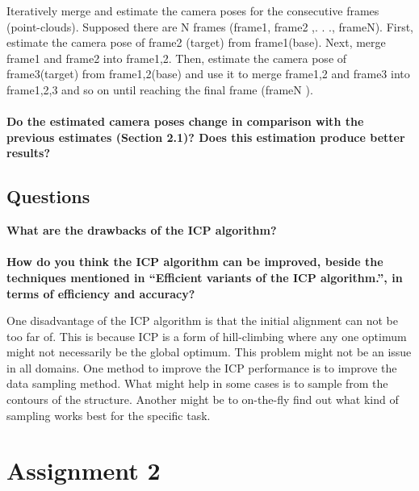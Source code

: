 \documentclass[12pt]{amsart}
\begin{document}
Iteratively merge and estimate the camera poses for the consecutive frames (point-clouds). Supposed there are N frames (frame1, frame2 ,. . ., frameN). First, estimate the camera pose of frame2 (target) from frame1(base). Next, merge frame1 and frame2 into frame1,2. Then, estimate the camera pose of frame3(target) from frame1,2(base) and use it to merge frame1,2 and frame3 into frame1,2,3 and so on until reaching the final frame (frameN ).\\\\ \textbf{Do the estimated camera poses change in comparison with the previous estimates (Section 2.1)? Does this estimation produce better results?}
\subsection{Questions}
\textbf{What are the drawbacks of the ICP algorithm?}\\\\
\textbf{How do you think the ICP algorithm can be improved, beside the techniques mentioned in ``Efficient variants of the ICP algorithm.'', in terms of efficiency and accuracy?}

One disadvantage of the ICP algorithm is that the initial alignment can not be too far of. This is because ICP is a form of hill-climbing where any one optimum might not necessarily be the global optimum. This problem might not be an issue in all domains. 
One method to improve the ICP performance is to improve the data sampling method. What might help in some cases is to sample from the contours of the structure. Another might be to on-the-fly find out what kind of sampling works best for the specific task.

\section{Assignment 2}
\end{document}
